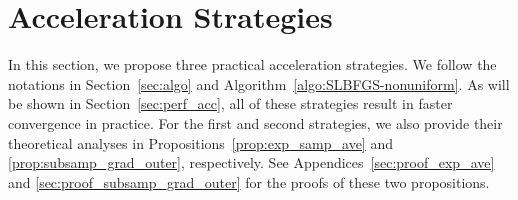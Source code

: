 \documentclass[10pt,twocolumn,journal]{IEEEtran}
\begin{document}
\section{Acceleration Strategies}\label{sec:acc_strategy}
In this section, we propose three practical acceleration strategies. %
We follow the notations in Section~\ref{sec:algo} and  Algorithm~\ref{algo:SLBFGS-nonuniform}. 
As will be shown in Section~\ref{sec:perf_acc}, all of these strategies result in faster convergence in practice. For the first and second strategies, we also provide their theoretical analyses in Propositions~\ref{prop:exp_samp_ave} and \ref{prop:subsamp_grad_outer}, respectively. See Appendices~\ref{sec:proof_exp_ave} and \ref{sec:proof_subsamp_grad_outer} for the proofs of these two propositions. %


\end{document}
